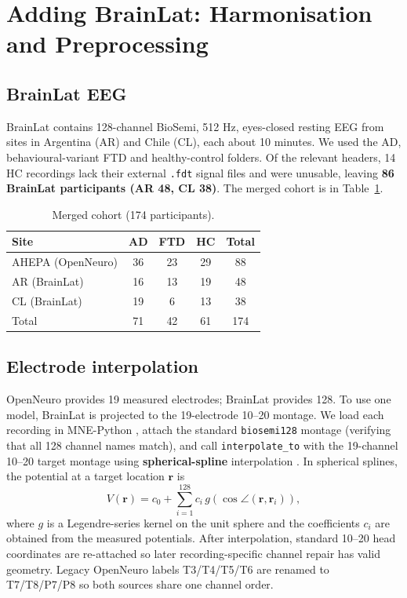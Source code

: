 \documentclass[10pt,twocolumn,a4paper]{article}
\newcommand{\code}[1]{\texttt{\small #1}}
\begin{document}
\section{Adding BrainLat: Harmonisation and Preprocessing}
\label{sec:brainlat}
\subsection{BrainLat EEG}
\label{sec:brainlatdata}
BrainLat \cite{prado2023} contains 128-channel BioSemi, 512 Hz, eyes-closed resting EEG from sites in Argentina (AR) and Chile (CL), each about 10 minutes. We used the AD, behavioural-variant FTD and healthy-control folders. Of the relevant headers, 14 HC recordings lack their external \code{.fdt} signal files and were unusable, leaving \textbf{86 BrainLat participants (AR 48, CL 38)}. The merged cohort is in Table~\ref{tab:cohort}.

\begin{table}[t]
\centering\small
\caption{Merged cohort (174 participants).}
\label{tab:cohort}
\begin{tabular}{@{}lcccc@{}}
\toprule
Site & AD & FTD & HC & Total\\
\midrule
AHEPA (OpenNeuro) & 36 & 23 & 29 & 88\\
AR (BrainLat) & 16 & 13 & 19 & 48\\
CL (BrainLat) & 19 & 6 & 13 & 38\\
\midrule
Total & 71 & 42 & 61 & 174\\
\bottomrule
\end{tabular}
\end{table}

\subsection{Electrode interpolation}
\label{sec:interp}
OpenNeuro provides 19 measured electrodes; BrainLat provides 128. To use one model, BrainLat is projected to the 19-electrode 10--20 montage. We load each recording in MNE-Python \cite{gramfort2013}, attach the standard \code{biosemi128} montage (verifying that all 128 channel names match), and call \code{interpolate\_to} with the 19-channel 10--20 target montage using \textbf{spherical-spline} interpolation \cite{perrin1989}. In spherical splines, the potential at a target location $\mathbf r$ is
\begin{equation}
V(\mathbf r)=c_0+\sum_{i=1}^{128}c_i\,g\!\left(\cos\angle(\mathbf r,\mathbf r_i)\right),
\end{equation}
where $g$ is a Legendre-series kernel on the unit sphere and the coefficients $c_i$ are obtained from the measured potentials. After interpolation, standard 10--20 head coordinates are re-attached so later recording-specific channel repair has valid geometry. Legacy OpenNeuro labels T3/T4/T5/T6 are renamed to T7/T8/P7/P8 so both sources share one channel order.
\end{document}
